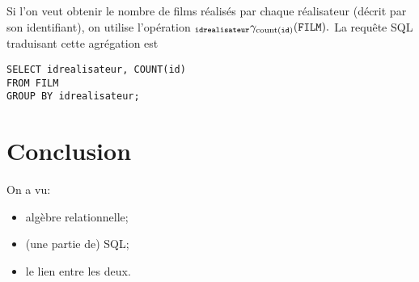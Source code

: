 \begin{exemple}
  Si l'on veut obtenir le nombre de films réalisés par chaque réalisateur (décrit par son identifiant), on utilise l'opération
$    {}_{\mathtt{idrealisateur}}\gamma_{\mathrm{count}(\mathtt{id})}(\mathtt{FILM}).$
  La requête SQL traduisant cette agrégation est 
\begin{verbatim}
SELECT idrealisateur, COUNT(id)
FROM FILM
GROUP BY idrealisateur;
\end{verbatim}
\end{exemple}


\section{Conclusion}

On a vu:
\begin{itemize}
\item algèbre relationnelle;
\item (une partie de) SQL;
\item le lien entre les deux.
\end{itemize}

